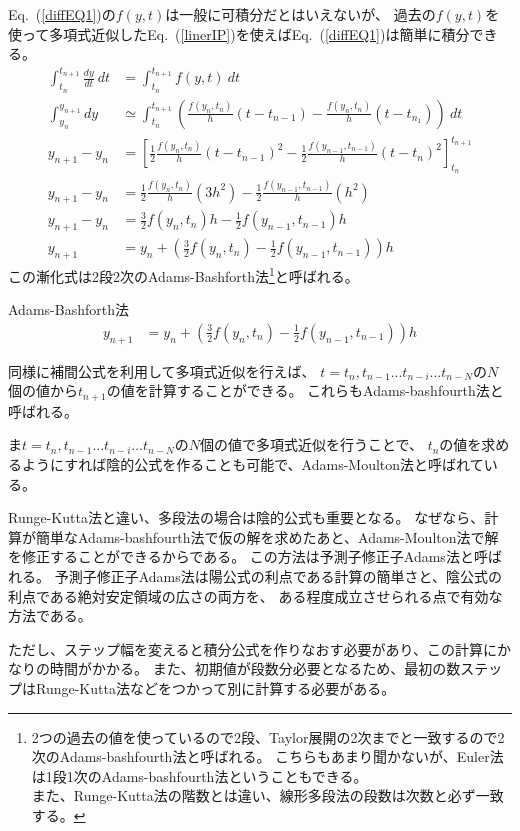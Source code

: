 \documentclass[autodetect-engine,dvipdfmx-if-dvi,ja=standard,a4paper,layout=v2]{bxjsreport}
\newcommand{\eref}[1]{Eq.~(\ref{#1})}
\begin{document}
    \eref{diffEQ1}の$f(y,t)$は一般に可積分だとはいえないが、
    過去の$f(y,t)$を使って多項式近似した\eref{linerIP}を使えば\eref{diffEQ1}は簡単に積分できる。
    \begin{align}
      \int^{t_{n+1}}_{t_n}\frac{dy}{dt}\:dt &= \int^{t_{n+1}}_{t_n}f(y, t)\: dt \nonumber\\
      \int^{y_{n+1}}_{y_n}dy &\simeq \int^{t_{n+1}}_{t_n}\left(\frac{f(y_n,t_n)}{h}(t-t_{n-1}) -
      \frac{f(y_n, t_n)}{h}(t-t_{n_1})\right)\:dt\nonumber\\
      y_{n+1}-y_n &= \left[\frac{1}{2}\frac{f(y_n,t_n)}{h}(t-t_{n-1})^2 -
      \frac{1}{2}\frac{f(y_{n-1}, t_{n-1})}{h}(t-t_{n})^2\right]^{t_{n+1}}_{t_n} \nonumber\\
      y_{n+1}-y_n &=  \frac{1}{2}\frac{f(y_n,t_n)}{h}(3h^2) - \frac{1}{2}\frac{f(y_{n-1}, t_{n-1})}{h}(h^2)\nonumber\\
      y_{n+1}-y_n &=  \frac{3}{2}f(y_n,t_n)h - \frac{1}{2}f(y_{n-1}, t_{n-1})h\nonumber\\
      y_{n+1} &= y_n + \left(\frac{3}{2}f(y_n,t_n) - \frac{1}{2}f(y_{n-1},t_{n-1})\right)h
    \end{align}
    この漸化式は2段2次のAdams-Bashforth法\footnote{
      2つの過去の値を使っているので2段、Taylor展開の2次までと一致するので2次のAdams-bashfourth法と呼ばれる。
      こちらもあまり聞かないが、Euler法は1段1次のAdams-bashfourth法ということもできる。\\
      また、Runge-Kutta法の階数とは違い、線形多段法の段数は次数と必ず一致する。
    }と呼ばれる。
    \begin{itembox}[l]{Adams-Bashforth法}
    \begin{align}
      y_{n+1} &= y_n + \left(\frac{3}{2}f(y_n,t_n) - \frac{1}{2}f(y_{n-1},t_{n-1})\right)h\label{ABMethod}
    \end{align}
    \end{itembox}
    同様に補間公式を利用して多項式近似を行えば、
    $t=t_n,t_{n-1}...t_{n-i}...t_{n-N}$の$N$個の値から$t_{n+1}$の値を計算することができる。
    これらもAdams-bashfourth法と呼ばれる。\par
    ま$t=t_n,t_{n-1}...t_{n-i}...t_{n-N}$の$N$個の値で多項式近似を行うことで、
    $t_n$の値を求めるようにすれば陰的公式を作ることも可能で、Adams-Moulton法と呼ばれている。\par
    Runge-Kutta法と違い、多段法の場合は陰的公式も重要となる。
    なぜなら、計算が簡単なAdams-bashfourth法で仮の解を求めたあと、Adams-Moulton法で解を修正することができるからである。
    この方法は予測子修正子Adams法と呼ばれる。
    予測子修正子Adams法は陽公式の利点である計算の簡単さと、陰公式の利点である絶対安定領域の広さの両方を、
    ある程度成立させられる点で有効な方法である。\par
    ただし、ステップ幅を変えると積分公式を作りなおす必要があり、この計算にかなりの時間がかかる。
    また、初期値が段数分必要となるため、最初の数ステップはRunge-Kutta法などをつかって別に計算する必要がある。\par
\end{document}
